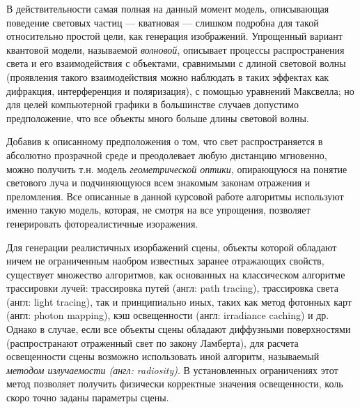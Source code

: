 \documentclass[12pt]{article}
\begin{document}
В действительности самая полная на данный момент модель, описывающая поведение световых частиц --- кватновая --- слишком подробна для такой относительно простой цели, как генерация изображений. Упрощенный вариант квантовой модели, называемой \emph{волновой}, описывает процессы распространения света и его взаимодействия с объектами, сравнимыми с длиной световой волны (проявления такого взаимодействия можно наблюдать в таких эффектах как дифракция, интерференция и поляризация), с помощью уравнений Максвелла; но для целей компьютерной графики в большинстве случаев допустимо предположение, что все объекты много больше длины световой волны.

Добавив к описанному предположения о том, что свет распространяется в абсолютно прозрачной среде и преодолевает любую дистанцию мгновенно, можно получить т.н. модель \emph{геометрической оптики}, опирающуюся на понятие светового луча и подчиняющуюся всем знакомым законам отражения и преломления. Все описанные в данной курсовой работе алгоритмы используют именно такую модель, которая, не смотря на все упрощения, позволяет генерировать фотореалистичные изоражения.

Для генерации реалистичных изорбажений сцены, объекты которой обладают ничем не ограниченным наобром известных заранее отражающих свойств, существует множество алгоритмов, как основанных на классическом алгоритме трассировки лучей: трассировка путей (англ: path tracing), трассировка света (англ: light tracing), так и принципиально иных, таких как метод фотонных карт (англ: photon mapping), кэш освещенности (англ: irradiance caching) и др. Однако в случае, если все объекты сцены обладают диффузными поверхностями (распространают отраженный свет по закону Ламберта), для расчета освещенности сцены возможно использовать иной алгоритм, называемый \emph{методом излучаемости (англ: radiosity)}. В установленных ограничениях этот метод позволяет получить физически корректные значения освещенности, коль скоро точно заданы параметры сцены. 
\end{document}
